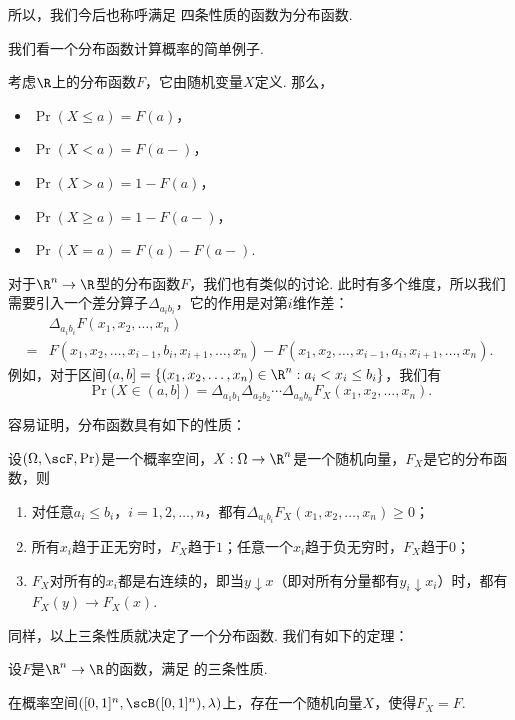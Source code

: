 所以，我们今后也称呼满足 四条性质的函数为分布函数. 

我们看一个分布函数计算概率的简单例子. 
\begin{example}\label{ex:distribution-prob}
    考虑$\R$上的分布函数$F$，它由随机变量$X$定义. 那么，
    \begin{itemize}
        \item $\Pr(X\leq a)=F(a)$，
        \item $\Pr(X<a)=F(a-)$，
        \item $\Pr(X>a)=1-F(a)$，
        \item $\Pr(X\geq a)=1-F(a-)$，
        \item $\Pr(X=a)=F(a)-F(a-)$. 
    \end{itemize}
    \end{example}

对于$\R^n\to\R$型的分布函数$F$，我们也有类似的讨论. 此时有多个维度，所以我们需要引入一个差分算子$\Delta_{a_ib_i}$，它的作用是对第$i$维作差：
\begin{align*}
    &\Delta_{a_ib_i}F(x_1,x_2,\ldots,x_n) \\
    = &F(x_1,x_2,\ldots,x_{i-1},b_i,x_{i+1},\ldots,x_n)-F(x_1,x_2,\ldots,x_{i-1},a_i,x_{i+1},\ldots,x_n).
\end{align*}
例如，对于区间$(a,b]=\{(x_1,x_2,\ldots,x_n)\in\R^n:a_i<x_i\leq b_i\}$，我们有
\[
    \Pr(X\in(a,b]) = \Delta_{a_1b_1}\Delta_{a_2b_2}\cdots\Delta_{a_nb_n}F_X(x_1,x_2,\ldots,x_n).
\]

容易证明，分布函数具有如下的性质：

\begin{proposition}\label{prop:distribution-function-n}
设$(\Omega,\scF,\Pr)$是一个概率空间，$X:\Omega\to\R^n$是一个随机向量，$F_X$是它的分布函数，则
\begin{enumerate}
    \item 对任意$a_i\leq b_i$，$i=1,2,\ldots,n$，都有$\Delta_{a_ib_i}F_X(x_1,x_2,\ldots,x_n)\geq 0$；
    \item 所有$x_i$趋于正无穷时，$F_X$趋于$1$；任意一个$x_i$趋于负无穷时，$F_X$趋于$0$；
    \item $F_X$对所有的$x_i$都是右连续的，即当$y\downarrow x$（即对所有分量都有$y_i\downarrow x_i$）时，都有$F_X(y)\to F_X(x)$.
\end{enumerate}
\end{proposition}

同样，以上三条性质就决定了一个分布函数. 我们有如下的定理：

\begin{theorem}\label{thm:distribution-function-n}
设$F$是$\R^n\to\R$的函数，满足 的三条性质.

在概率空间$([0,1]^n,\scB([0,1]^n),\lambda)$上，存在一个随机向量$X$，使得$F_X=F$.
\end{theorem}


